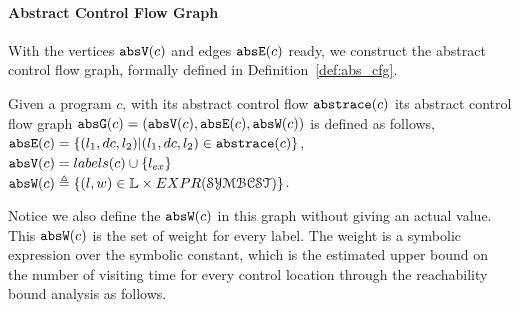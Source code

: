 %


\paragraph{Abstract Control Flow Graph} 
With the vertices $\mathtt{abs}{\mathtt{V}}(c)$ and edges $\mathtt{abs}{\mathtt{E}}(c)$ ready, we construct the abstract control flow graph, formally 
defined in 
Definition~\ref{def:abs_cfg}.
\begin{defn}
\label{def:abs_cfg}
Given a program $c$, 
with its abstract control flow $\mathtt{abs}{\mathtt{trace}}(c)$
its abstract control flow graph $\mathtt{abs}{\mathtt{G}}(c) =(\mathtt{abs}{\mathtt{V}}(c), \mathtt{abs}{\mathtt{E}}(c), \mathtt{abs}{\mathtt{W}}(c))$ is defined as follows,
\\
%
$\mathtt{abs}{\mathtt{E}}(c) = \{(l_1, dc, l_2) | (l_1, dc, l_2) \in \mathtt{abs}{\mathtt{trace}}(c)\}$,
\\
$\mathtt{abs}{\mathtt{V}}(c) = labels(c)\cup\{l_{ex}\}$
\\
 $\absW(c) 
\triangleq \left\{ (l, w) \in \mathbb{L} \times EXPR(\constdom) \right\}$.
\end{defn}
% 
Notice we also define the $\mathtt{abs}{\mathtt{W}}(c)$ in this graph without giving an actual value.
This $\mathtt{abs}{\mathtt{W}}(c)$ is the set of weight for every 
label. The weight is a symbolic expression over the symbolic constant, 
which is the estimated upper bound on the number of visiting time for every control location
through the reachability bound analysis as follows.
%
%

